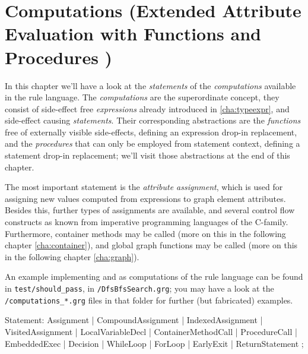 \chapter{Computations (Extended Attribute Evaluation with Functions and Procedures )}
\label{cha:computations}

In this chapter we'll have a look at the \emph{statements} of the \emph{computations} available in the rule language.
The \emph{computations} are the superordinate concept, they consist of side-effect free \emph{expressions} already introduced in \ref{cha:typeexpr}, and side-effect causing \emph{statements}.
Their corresponding abstractions are the \emph{functions} free of externally visible side-effects, defining an expression drop-in replacement, and the \emph{procedures} that can only be employed from statement context, defining a statement drop-in replacement; we'll visit those abstractions at the end of this chapter.

The most important statement is the \emph{attribute assignment}, which is used for assigning new values computed from expressions to graph element attributes.
Besides this, further types of assignments are available, and several control flow constructs as known from imperative programming languages of the C-family.
Furthermore, container methods may be called (more on this in the following chapter \ref{cha:container}), 
and global graph functions may be called (more on this in the following chapter \ref{cha:graph}).

An example implementing  and  as computations of the rule language can be found in \texttt{test/should\_pass}, in \texttt{/DfsBfsSearch.grg}; you may have a look at the \verb#/computations_*.grg# files in that folder for further (but fabricated) examples.

\begin{rail}
  Statement:
      Assignment
    | CompoundAssignment
    | IndexedAssignment
    | VisitedAssignment
    | LocalVariableDecl
    | ContainerMethodCall
    | ProcedureCall
    | EmbeddedExec
    | Decision
    | WhileLoop
    | ForLoop
    | EarlyExit
    | ReturnStatement
    ;
\end{rail}\label{computationstatemet}



